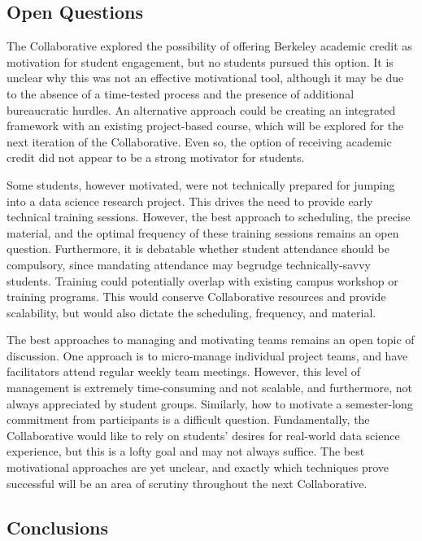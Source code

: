 \documentclass[12pt]{article}
\begin{document}
\subsection{Open Questions}

The Collaborative explored the possibility of offering Berkeley academic credit as motivation for student engagement, but no students pursued this option. It is unclear why this was not an effective motivational tool, although it may be due to the absence of a time-tested process and the presence of additional bureaucratic hurdles. An alternative approach could be creating an integrated framework with an existing project-based course, which will be explored for the next iteration of the Collaborative.  Even so, the option of receiving academic credit did not appear to be a strong motivator for students.

Some students, however motivated, were not technically prepared for jumping into a data science research project.  This drives the need to provide early technical training sessions.  However, the best approach to scheduling, the precise material, and the optimal frequency of these training sessions remains an open question.  Furthermore, it is debatable whether student attendance should be compulsory, since mandating attendance may begrudge technically-savvy students.  Training could potentially overlap with existing campus workshop or training programs.  This would conserve Collaborative resources and provide scalability, but would also dictate the scheduling, frequency, and material.

The best approaches to managing and motivating teams remains an open topic of discussion.  One approach is to micro-manage individual project teams, and have facilitators attend regular weekly team meetings.  However, this level of management is extremely time-consuming and not scalable, and furthermore, not always appreciated by student groups.  Similarly, how to motivate a semester-long commitment from participants is a difficult question.  Fundamentally, the Collaborative would like to rely on students' desires for real-world data science experience, but this is a lofty goal and may not always suffice.  The best motivational approaches are yet unclear, and exactly which techniques prove successful will be an area of scrutiny throughout the next Collaborative.

\subsection{Conclusions}
\end{document}

